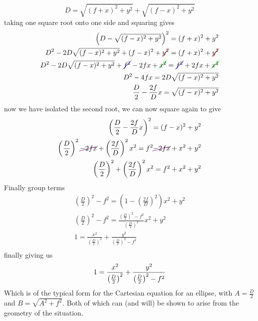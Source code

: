 \documentclass[a5paper,12pt]{article}
\begin{document}
\begin{equation}
D=\sqrt{(f+x)^2+y^2}+\sqrt{(f-x)^2+y^2}
\end{equation}
taking one square root onto one side and squaring gives
\begin{subequations}
\begin{align}
\left(D-\sqrt{(f-x)^2+y^2}\right)^2=(f+x)^2+y^2\\
D^2-2D\sqrt{(f-x)^2+y^2}+(f-x)^2+\Ccancel[red]{y^2}=(f+x)^2+\Ccancel[red]{y^2}\\
D^2-2D\sqrt{(f-x)^2+y^2}+\Ccancel[blue]{f^2}-2fx+\Ccancel[green]{x^2}=\Ccancel[blue]{f^2}+2fx+\Ccancel[green]{x^2}\\
D^2-4fx=2D\sqrt{(f-x)^2+y^2}\\
\frac{D}{2}-\frac{2f}{D}x=\sqrt{(f-x)^2+y^2}
\end{align}
\end{subequations}
now we have isolated the second root, we can now square again to give
\begin{subequations}
\begin{align}
\left(\frac{D}{2}-\frac{2f}{D}x\right)^2=(f-x)^2+y^2\\
\left(\frac{D}{2}\right)^2\Ccancel[violet]{-2fx}+\left(\frac{2f}{D}\right)^2x^2=f^2\Ccancel[violet]{-2fx}+x^2+y^2\\
\left(\frac{D}{2}\right)^2+\left(\frac{2f}{D}\right)^2x^2=f^2+x^2+y^2
\end{align}
\end{subequations}
Finally group terms
\begin{subequations}
\begin{align}
\left(\frac{D}{2}\right)^2-f^2=\left(1-\left(\frac{2f}{D}\right)^2\right)x^2+y^2\\
\left(\frac{D}{2}\right)^2-f^2=\frac{\left(\frac{D}{2}\right)^2-f^2}{\left(\frac{D}{2}\right)^2}x^2+y^2\\
1=\frac{x^2}{\left(\frac{D}{2}\right)^2}+\frac{y^2}{\left(\frac{D}{2}\right)^2-f^2}\\
\end{align}
\end{subequations}
finally giving us
\begin{equation}
1=\frac{x^2}{\left(\frac{D}{2}\right)^2}+\frac{y^2}{\left(\frac{D}{2}\right)^2-f^2}\\
\end{equation}
Which is of the typical form for the Cartesian equation for an ellipse, with $A=\frac{D}{2}$ and $B=\sqrt{A^2+f^2}$. Both of which can (and will) be shown to arise from the geometry of the situation.
\end{document}
